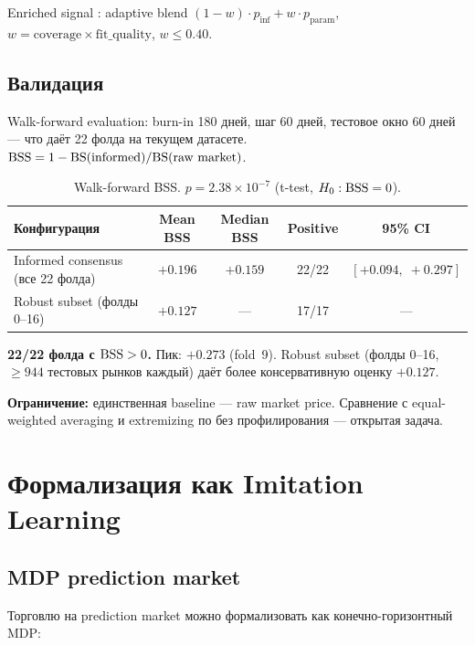 Enriched signal \citep{clinton2024polymarket}: adaptive blend
$(1-w)\cdot p_{\mathrm{inf}} + w \cdot p_{\mathrm{param}}$,
$w = \mathrm{coverage} \times \mathrm{fit\_quality}$, $w \leq 0.40$.

\subsection{Валидация}

Walk-forward evaluation: burn-in 180 дней, шаг 60 дней, тестовое окно 60 дней ---
что даёт 22 фолда на текущем датасете.
$\mathrm{BSS} = 1 - \mathrm{BS}(\text{informed}) / \mathrm{BS}(\text{raw market})$.

\begin{table}[h]
\centering
\begin{tabular}{lcccc}
\toprule
\textbf{Конфигурация} & \textbf{Mean BSS} & \textbf{Median BSS} & \textbf{Positive} & \textbf{95\% CI} \\
\midrule
Informed consensus (все 22 фолда)  & $+0.196$ & $+0.159$ & 22/22 & $[+0.094,\; +0.297]$ \\
Robust subset (фолды 0--16)        & $+0.127$ & ---      & 17/17 & --- \\
\bottomrule
\end{tabular}
\caption{Walk-forward BSS. $p = 2.38 \times 10^{-7}$ (t-test, $H_0: \mathrm{BSS} = 0$).}
\label{tab:walkforward}
\end{table}

\textbf{22/22 фолда с $\mathrm{BSS} > 0$.} Пик: $+0.273$ (fold~9).
Robust subset (фолды 0--16, $\geq 944$ тестовых рынков каждый) даёт
более консервативную оценку $+0.127$.

\textbf{Ограничение:} единственная baseline --- raw market price.
Сравнение с equal-weighted averaging и extremizing по
\citealt{satopaa2014combining} без профилирования --- открытая задача.

\section{Формализация как Imitation Learning}
\label{sec:il}

\subsection{MDP prediction market}

Торговлю на prediction market можно формализовать как конечно-горизонтный MDP:

